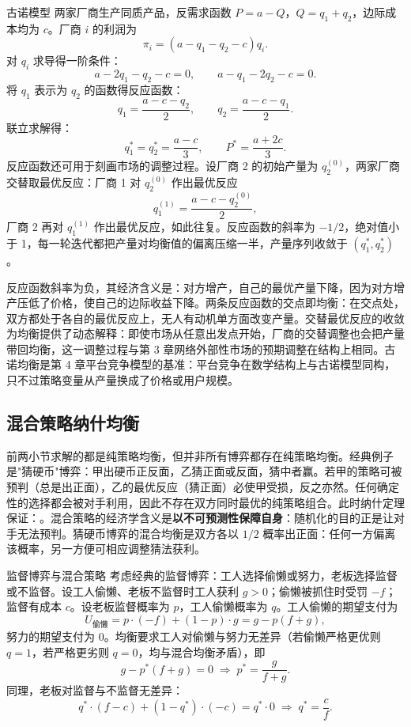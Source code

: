 \begin{derivation}{古诺模型}{}
两家厂商生产同质产品，反需求函数 $P = a - Q$，$Q = q_1 + q_2$，边际成本均为 $c$。厂商 $i$ 的利润为
\[
\pi_i = (a - q_1 - q_2 - c) q_i.
\]
对 $q_i$ 求导得一阶条件：
\[
a - 2q_1 - q_2 - c = 0, \qquad a - q_1 - 2q_2 - c = 0.
\]
将 $q_1$ 表示为 $q_2$ 的函数得反应函数：
\[
q_1 = \frac{a - c - q_2}{2}, \qquad q_2 = \frac{a - c - q_1}{2}.
\]
联立求解得：
\[
q_1^* = q_2^* = \frac{a-c}{3}, \qquad P^* = \frac{a + 2c}{3}.
\]
反应函数还可用于刻画市场的调整过程。设厂商 2 的初始产量为 $q_2^{(0)}$，两家厂商交替取最优反应：厂商 1 对 $q_2^{(0)}$ 作出最优反应
\[
q_1^{(1)} = \frac{a - c - q_2^{(0)}}{2},
\]
厂商 2 再对 $q_1^{(1)}$ 作出最优反应，如此往复。反应函数的斜率为 $-1/2$，绝对值小于 1，每一轮迭代都把产量对均衡值的偏离压缩一半，产量序列收敛于 $(q_1^*, q_2^*)$。
\end{derivation}

反应函数斜率为负，其经济含义是：对方增产，自己的最优产量下降，因为对方增产压低了价格，使自己的边际收益下降。两条反应函数的交点即均衡：在交点处，双方都处于各自的最优反应上，无人有动机单方面改变产量。交替最优反应的收敛为均衡提供了动态解释：即使市场从任意出发点开始，厂商的交替调整也会把产量带回均衡，这一调整过程与第 3 章网络外部性市场的预期调整在结构上相同。古诺均衡是第 4 章平台竞争模型的基准：平台竞争在数学结构上与古诺模型同构，只不过策略变量从产量换成了价格或用户规模。


\subsection{混合策略纳什均衡}

前两小节求解的都是纯策略均衡，但并非所有博弈都存在纯策略均衡。经典例子是"猜硬币"博弈：甲出硬币正反面，乙猜正面或反面，猜中者赢。若甲的策略可被预判（总是出正面），乙的最优反应（猜正面）必使甲受损，反之亦然。任何确定性的选择都会被对手利用，因此不存在双方同时最优的纯策略组合。此时纳什定理保证：。混合策略的经济学含义是\textbf{以不可预测性保障自身}：随机化的目的正是让对手无法预判。猜硬币博弈的混合均衡是双方各以 $1/2$ 概率出正面：任何一方偏离该概率，另一方便可相应调整猜法获利。

\begin{derivation}{监督博弈与混合策略}{}
考虑经典的监督博弈：工人选择偷懒或努力，老板选择监督或不监督。设工人偷懒、老板不监督时工人获利 $g>0$；偷懒被抓住时受罚 $-f$；监督有成本 $c$。设老板监督概率为 $p$，工人偷懒概率为 $q$。工人偷懒的期望支付为
\[
U_{\text{偷懒}} = p\cdot(-f) + (1-p)\cdot g = g - p(f+g),
\]
努力的期望支付为 $0$。均衡要求工人对偷懒与努力无差异（若偷懒严格更优则 $q=1$，若严格更劣则 $q=0$，均与混合均衡矛盾），即
\[
g - p^*(f+g) = 0 \;\Rightarrow\; p^* = \frac{g}{f+g}.
\]
同理，老板对监督与不监督无差异：
\[
q^*\cdot(f - c) + (1-q^*)\cdot(-c) = q^*\cdot 0 \;\Rightarrow\; q^* = \frac{c}{f}.
\]
\end{derivation}

